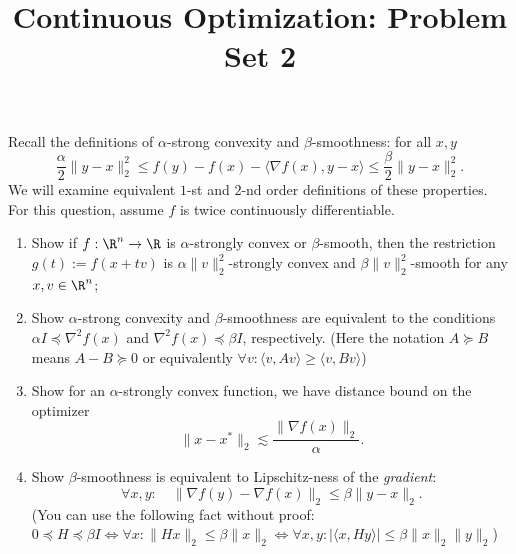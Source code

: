 \documentclass[addpoints,12pt,A4]{exam}
\title{Continuous Optimization: Problem Set 2}
\begin{document}
\maketitle

\begin{questions}

 \question
 Recall the definitions of $\alpha$-strong convexity and $\beta$-smoothness: for all $x,y$
 \[ \frac{\alpha}{2} \|y - x\|_{2}^{2} \leq f(y) - f(x) - \langle \nabla f(x), y - x \rangle \leq \frac{\beta}{2} \|y - x\|_{2}^{2} .   \]
 We will examine equivalent $1$-st and $2$-nd order definitions of these properties. For this question, assume $f$ is twice continuously differentiable. 
 \begin{enumerate}
    \item Show if $f : \R^{n} \to \R$ is $\alpha$-strongly convex or $\beta$-smooth, then the restriction $g(t) := f(x + t v)$ is $\alpha \|v\|_{2}^{2}$-strongly convex and $\beta \|v\|_{2}^{2}$-smooth for any $x, v \in \R^{n}$;
     \item Show $\alpha$-strong convexity and $\beta$-smoothness are equivalent to the conditions $\alpha I \preceq \nabla^{2} f(x)$ and $\nabla^{2} f(x) \preceq \beta I$, respectively. (Here the notation $A \succeq B$ means $A - B \succeq 0$ or equivalently $\forall v: \langle v, A v \rangle \geq \langle v, B v \rangle$)
     \item Show for an $\alpha$-strongly convex function, we have distance bound on the optimizer
     \[ \|x - x^{*}\|_{2} \lesssim \frac{\|\nabla f(x)\|_{2}}{\alpha} .  \]     
     \item Show $\beta$-smoothness is equivalent to Lipschitz-ness of the \emph{gradient}:
     \[ \forall x,y : \quad \|\nabla f(y) - \nabla f(x)\|_{2} \leq \beta \|y - x\|_{2} .   \]
     (You can use the following fact without proof: $0 \preceq H \preceq \beta I \iff \forall x: \|H x\|_{2} \leq \beta \|x\|_{2} \iff \forall x,y: |\langle x, H y \rangle| \leq \beta \|x\|_{2} \|y\|_{2}$)
 \end{enumerate}
 \begin{solution}
\end{solution}


\end{questions}
\end{document}
